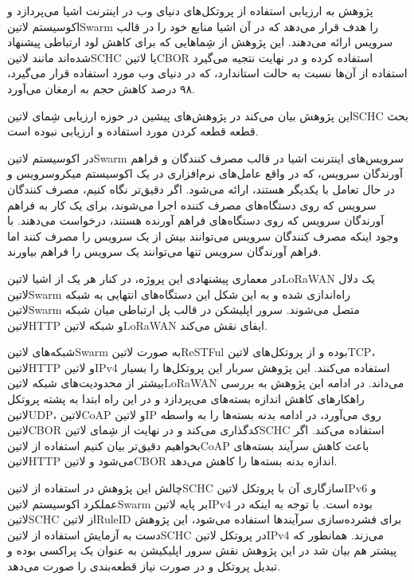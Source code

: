 
پژوهش  به ارزیابی استفاده از پروتکل‌های دنیای وب در اینترنت اشیا می‌پردازد و اکوسیستم ‌لاتین{Swarm} را هدف قرار می‌دهد که در آن اشیا
منابع خود را در قالب سرویس ارائه می‌دهند. این پژوهش از شِماهایی که برای کاهش لود ارتباطی پیشنهاد شده‌اند مانند ‌لاتین{SCHC} یا ‌لاتین{CBOR}
استفاده کرده و در نهایت نتجیه می‌گیرد استفاده از آن‌ها نسبت به حالت استاندارد، که در دنیای وب مورد استفاده قرار می‌گیرد، ۹۸ درصد کاهش حجم به ارمغان می‌آورد.

این پژوهش بیان می‌کند در پژوهش‌های پیشین در حوزه ارزیابی شِمای ‌لاتین{SCHC} بحث قطعه قطعه کردن مورد استفاده و ارزیابی نبوده است.

در اکوسیستم ‌لاتین{Swarm} سرویس‌های اینترنت اشیا در قالب مصرف کنندگان و فراهم آورندگان سرویس،
که در واقع عامل‌های نرم‌افزاری در یک اکوسیستم میکروسرویس و در حال تعامل با یکدیگر هستند،
ارائه می‌شود.
اگر دقیق‌تر نگاه کنیم، مصرف کنندگان سرویس که روی دستگاه‌های مصرف کننده اجرا می‌شوند، برای یک کار
به فراهم آورندگان سرویس که روی دستگاه‌های فراهم آورنده هستند، درخواست می‌دهند.
با وجود اینکه مصرف کنندگان سرویس می‌توانند بیش از یک سرویس را مصرف کنند اما فراهم آورندگان سرویس
تنها می‌توانند یک سرویس را فراهم بیاورند.

در معماری پیشنهادی این پروژه، در کنار هر یک از اشیا ‌لاتین{LoRaWAN} یک دلال ‌لاتین{Swarm} راه‌اندازی شده و به این شکل
این دستگاه‌های انتهایی به شبکه ‌لاتین{Swarm} متصل می‌شوند. سرور اپلیشکن در قالب پل ارتباطی میان شبکه ‌لاتین{HTTP}
و شبکه ‌لاتین{LoRaWAN} ایفای نقش می‌کند.

شبکه‌های ‌لاتین{Swarm} به صورت ‌لاتین{ReSTFul} بوده و از پروتکل‌های ‌لاتین{TCP}، ‌لاتین{HTTP} و ‌لاتین{IPv4}
استفاده می‌کنند. این پژوهش سربار این پروتکل‌ها را بسیار بیشتر از محدودیت‌های شبکه ‌لاتین{LoRaWAN} می‌داند.
در ادامه این پژوهش به بررسی راهکارهای کاهش اندازه بسته‌های می‌پردازد و در این راه ابتدا به پشته پروتکل ‌لاتین{UDP}، ‌لاتین{CoAP} و ‌لاتین{IP}
روی می‌آورد، در ادامه بدنه بسته‌ها را به واسطه ‌لاتین{CBOR} کدگذاری می‌کند
و در نهایت از شِمای ‌لاتین{SCHC} استفاده می‌کند.
اگر بخواهیم دقیق‌تر بیان کنیم استفاده از ‌لاتین{CoAP} باعث کاهش سرآیند بسته‌های ‌لاتین{HTTP} می‌شود و ‌لاتین{CBOR}
اندازه بدنه بسته‌ها را کاهش می‌دهد.

چالش این پژوهش در استفاده از ‌لاتین{SCHC} سازگاری آن با پروتکل ‌لاتین{IPv6} و عملکرد اکوسیستم ‌لاتین{Swarm}
بر پایه ‌لاتین{IPv4} بوده است.
با توجه به اینکه در ‌لاتین{SCHC} از ‌لاتین{RuleID} برای فشرده‌سازی سرآیندها استفاده می‌شود، این پژوهش دست به آزمایش
استفاده از ‌لاتین{SCHC} در پروتکل ‌لاتین{IPv4} می‌زند.
همانطور که پیشتر هم بیان شد در این پژوهش نقش سرور اپلیکیشن به عنوان یک پراکسی بوده و تبدیل پروتکل و در صورت نیاز
قطعه‌بندی را صورت می‌دهد.


